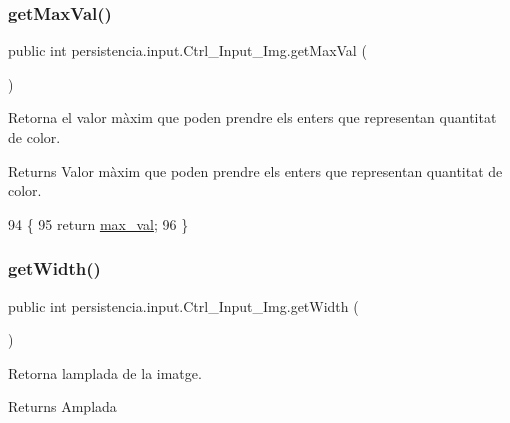\subsubsection{\texorpdfstring{get\+Max\+Val()}{getMaxVal()}}
{\footnotesize\ttfamily public int persistencia.\+input.\+Ctrl\+\_\+\+Input\+\_\+\+Img.\+get\+Max\+Val (\begin{DoxyParamCaption}{ }\end{DoxyParamCaption})\hspace{0.3cm}{\ttfamily [inline]}}



Retorna el valor màxim que poden prendre els enters que representan quantitat de color. 

\begin{DoxyReturn}{Returns}
Valor màxim que poden prendre els enters que representan quantitat de color. 
\end{DoxyReturn}

\begin{DoxyCode}
94                            \{
95         \textcolor{keywordflow}{return} \hyperlink{classpersistencia_1_1input_1_1Ctrl__Input__Img_a1b8fa2d000a1d5d873be62d1f609e4be}{max\_val};
96     \}
\end{DoxyCode}
\mbox{\label{classpersistencia_1_1input_1_1Ctrl__Input__Img_ab4cda237a52c99efb4411e0e86f3d3a2}} 
\subsubsection{\texorpdfstring{get\+Width()}{getWidth()}}
{\footnotesize\ttfamily public int persistencia.\+input.\+Ctrl\+\_\+\+Input\+\_\+\+Img.\+get\+Width (\begin{DoxyParamCaption}{ }\end{DoxyParamCaption})\hspace{0.3cm}{\ttfamily [inline]}}



Retorna l\textquotesingle{}amplada de la imatge. 

\begin{DoxyReturn}{Returns}
Amplada 
\end{DoxyReturn}


